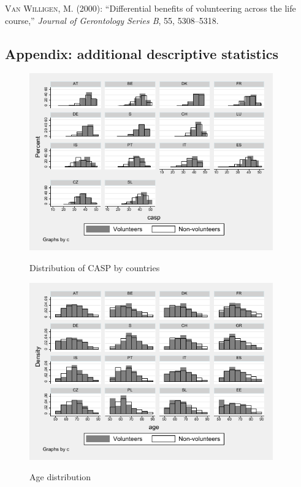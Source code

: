 \documentclass[10pt, letterpaper]{article}
\begin{document}
\begin{spacing}{1.4}
\begin{thebibliography}{87}
\textsc{Van Willigen, M.} (2000): \enquote{Differential benefits of volunteering across the life course,} \emph{Journal of Gerontology Series B}, 55, 5308--5318.


\end{thebibliography}


\begin{spacing}{.9}

\section{Appendix: additional descriptive statistics}


\begin{figure}[H]
 \includegraphics[height=3in]{hist_casp.pdf}
 \centering
 \label{fig:hist_casp}
\caption{Distribution of CASP by countries}
\end{figure}

\begin{spacing}{.9}
	 
      \label{KendallCasp} 
\end{spacing}




 

\begin{figure}[H]
 \includegraphics[height=3in]{hist_age.pdf}
 \centering
 \label{fig:hist_age}
\caption{Age distribution}
\end{figure}



\end{spacing}
\end{spacing}
\end{document}
